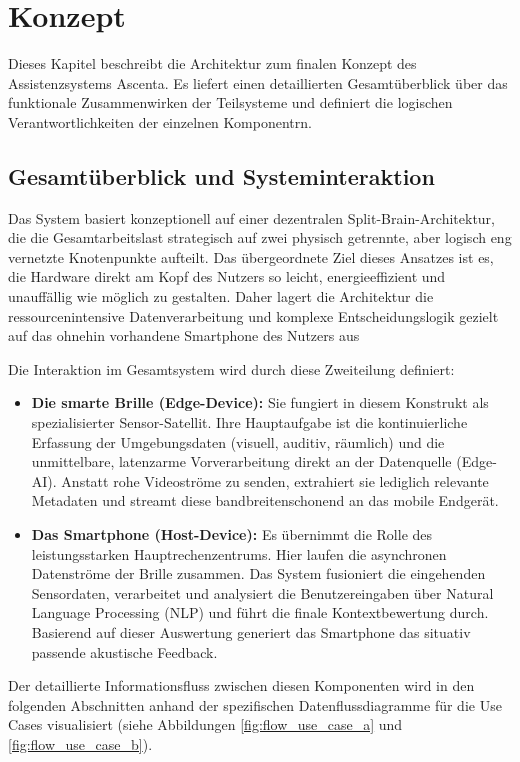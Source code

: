 \chapter{Konzept}
Dieses Kapitel beschreibt die Architektur zum finalen Konzept des Assistenzsystems \glqq Ascenta\grqq. Es liefert einen detaillierten Gesamtüberblick über das funktionale Zusammenwirken der Teilsysteme und definiert die logischen Verantwortlichkeiten der einzelnen Komponentrn.

\section{Gesamtüberblick und Systeminteraktion}
Das System basiert konzeptionell auf einer dezentralen \glqq Split-Brain\grqq-Architektur, die die Gesamtarbeitslast strategisch auf zwei physisch getrennte, aber logisch eng vernetzte Knotenpunkte aufteilt. Das übergeordnete Ziel dieses Ansatzes ist es, die Hardware direkt am Kopf des Nutzers so leicht, energieeffizient und unauffällig wie möglich zu gestalten. Daher lagert die Architektur die ressourcenintensive Datenverarbeitung und komplexe Entscheidungslogik gezielt auf das ohnehin vorhandene Smartphone des Nutzers aus

Die Interaktion im Gesamtsystem wird durch diese Zweiteilung definiert:
\begin{itemize}
    \item \textbf{Die smarte Brille (Edge-Device):} Sie fungiert in diesem Konstrukt als spezialisierter Sensor-Satellit. Ihre Hauptaufgabe ist die kontinuierliche Erfassung der Umgebungsdaten (visuell, auditiv, räumlich) und die unmittelbare, latenzarme Vorverarbeitung direkt an der Datenquelle (Edge-AI). Anstatt rohe Videoströme zu senden, extrahiert sie lediglich relevante Metadaten und streamt diese bandbreitenschonend an das mobile Endgerät.
    \item \textbf{Das Smartphone (Host-Device):} Es übernimmt die Rolle des leistungsstarken Hauptrechenzentrums. Hier laufen die asynchronen Datenströme der Brille zusammen. Das System fusioniert die eingehenden Sensordaten, verarbeitet und analysiert die Benutzereingaben über Natural Language Processing (NLP) und führt die finale Kontextbewertung durch. Basierend auf dieser Auswertung generiert das Smartphone das situativ passende akustische Feedback.
\end{itemize}

Der detaillierte Informationsfluss zwischen diesen Komponenten wird in den folgenden Abschnitten anhand der spezifischen Datenflussdiagramme für die Use Cases visualisiert (siehe Abbildungen \ref{fig:flow_use_case_a} und \ref{fig:flow_use_case_b}).


